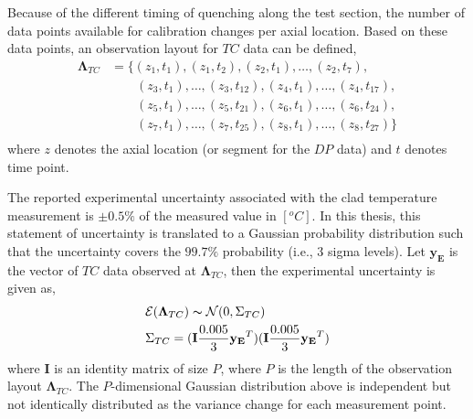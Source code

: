 Because of the different timing of quenching along the test section, the number of data points available for calibration changes per axial location.
Based on these data points, an observation layout for $TC$ data can be defined,
\begin{equation}
	\begin{split}
		\boldsymbol{\Lambda}_{TC} & = \{(z_1,t_1),(z_1,t_{2}),(z_2,t_1),\ldots,(z_2,t_{7}),\\
															& \quad\quad (z_3,t_1),\ldots,(z_3,t_{12}),(z_4,t_1),\ldots,(z_4,t_{17}),  \\
															& \quad\quad (z_5,t_1),\ldots,(z_5,t_{21}),(z_6,t_1),\ldots,(z_6,t_{24}),  \\
															& \quad\quad (z_7,t_1),\ldots,(z_7,t_{25}),(z_8,t_1),\ldots,(z_8,t_{27})\} \\
	\end{split}
\label{eq:bc_observation_layout_feba_tc}
\end{equation}
where $z$ denotes the axial location (or segment for the $DP$ data) and $t$ denotes time point.

The reported experimental uncertainty associated with the clad temperature measurement is $\pm0.5\%$ of the measured value in $[^oC]$.
In this thesis, this statement of uncertainty is translated to a Gaussian probability distribution such that the uncertainty covers the $99.7\%$ probability (i.e., $3$ sigma levels).
Let $\mathbf{y_E}$ is the vector of $TC$ data observed at $\boldsymbol{\Lambda}_{TC}$, then the experimental uncertainty is given as,
\begin{equation}
	\begin{split}
		& \mathcal{E}(\boldsymbol{\Lambda}_{TC}) \thicksim \mathcal{N}(0, \Sigma_{TC})\\
		& \Sigma_{TC} = (\mathbf{I} \frac{0.005}{3} \mathbf{y_E}^T) (\mathbf{I} \frac{0.005}{3} \mathbf{y_E}^T)
	\end{split}	
\label{eq:bc_experimenta_uncertainty_feba_tc}
\end{equation}
where $\mathbf{I}$ is an identity matrix of size $P$, where $P$ is the length of the observation layout $\boldsymbol{\Lambda}_{TC}$.
The $P$-dimensional Gaussian distribution above is independent but not identically distributed as the variance change for each measurement point.

